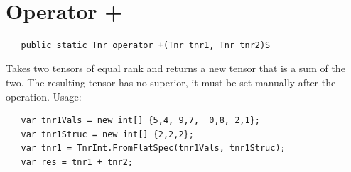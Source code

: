 

\cfoot{\thepage}								      %
\renewcommand{\headrulewidth}{0.0cm}			%
\renewcommand{\footrulewidth}{0.0cm}			%
\lstset{language=[Sharp]C,basicstyle=\small\sffamily}



\begin{center}
   \textbf{\LARGE{}}\\[0.25cm]
\end{center}

\section{Operator +}

\begin{lstlisting}
   public static Tnr operator +(Tnr tnr1, Tnr tnr2)S
\end{lstlisting}

Takes two tensors of equal rank and returns a new tensor that is a sum of the two. The resulting tensor has no superior, it must be set manually after the operation. Usage:
\begin{lstlisting}
   var tnr1Vals = new int[] {5,4, 9,7,  0,8, 2,1};
   var tnr1Struc = new int[] {2,2,2};
   var tnr1 = TnrInt.FromFlatSpec(tnr1Vals, tnr1Struc);
   var res = tnr1 + tnr2;
\end{lstlisting}

